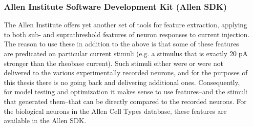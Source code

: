 \subsubsection{Allen Institute Software Development Kit (Allen SDK)}
\label{sec:allensdk}
The Allen Institute offers yet another set of tools for feature extraction, applying to both sub- and suprathreshold features of neuron responses to current injection.
The reason to use these in addition to the above is that some of these features are predicated on particular current stimuli (e.g. a stimulus that is exactly 20 pA stronger than the rheobase current).
Such stimuli either were or were not delivered to the various experimentally recorded neurons, and for the purposes of this thesis there is no going back and delivering additional ones.
Consequently, for model testing and optimization it makes sense to use features--and the stimuli that generated them--that can be directly compared to the recorded neurons.
For the biological neurons in the Allen Cell Types database, these features are available in the Allen SDK.

